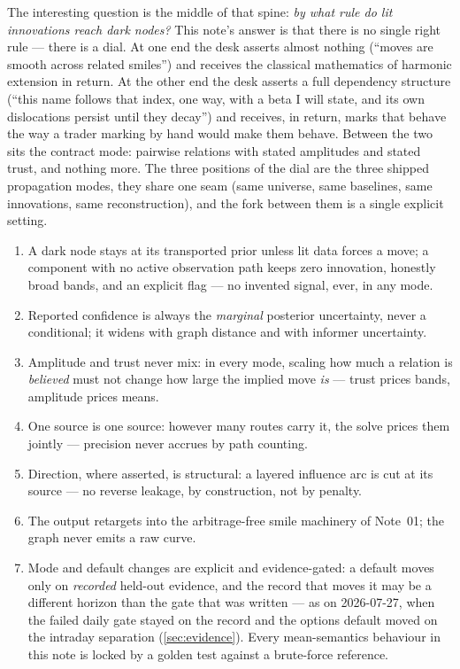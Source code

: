 \documentclass[11pt]{article}
\begin{document}
The interesting question is the middle of that spine: \emph{by what rule do
lit innovations reach dark nodes?}  This note's answer is that there is no
single right rule --- there is a dial.  At one end the desk asserts almost
nothing (``moves are smooth across related smiles'') and receives the
classical mathematics of harmonic extension in return.  At the other end
the desk asserts a full dependency structure (``this name follows that
index, one way, with a beta I will state, and its own dislocations persist
until they decay'') and receives, in return, marks that behave the way a
trader marking by hand would make them behave.  Between the two sits the
contract mode: pairwise relations with stated amplitudes and stated trust,
and nothing more.  The three positions of the dial are the three shipped
propagation modes, they share one seam (same universe, same baselines, same
innovations, same reconstruction), and the fork between them is a single
explicit setting.

\begin{invariant}
\begin{enumerate}[leftmargin=1.6em]
\item A dark node stays at its transported prior unless lit data forces a
move; a component with no active observation path keeps zero innovation,
honestly broad bands, and an explicit flag --- no invented signal, ever, in
any mode.
\item Reported confidence is always the \emph{marginal} posterior
uncertainty, never a conditional; it widens with graph distance and with
informer uncertainty.
\item Amplitude and trust never mix: in every mode, scaling how much a
relation is \emph{believed} must not change how large the implied move
\emph{is} --- trust prices bands, amplitude prices means.
\item One source is one source: however many routes carry it, the solve
prices them jointly --- precision never accrues by path counting.
\item Direction, where asserted, is structural: a layered influence arc is
cut at its source --- no reverse leakage, by construction, not by penalty.
\item The output retargets into the arbitrage-free smile machinery of
Note~01; the graph never emits a raw curve.
\item Mode and default changes are explicit and evidence-gated: a default
moves only on \emph{recorded} held-out evidence, and the record that moves
it may be a different horizon than the gate that was written --- as on
2026-07-27, when the failed daily gate stayed on the record and the
options default moved on the intraday separation
(\cref{sec:evidence}).  Every mean-semantics behaviour in this note is
locked by a golden test against a brute-force reference.
\end{enumerate}
\end{invariant}
\end{document}
